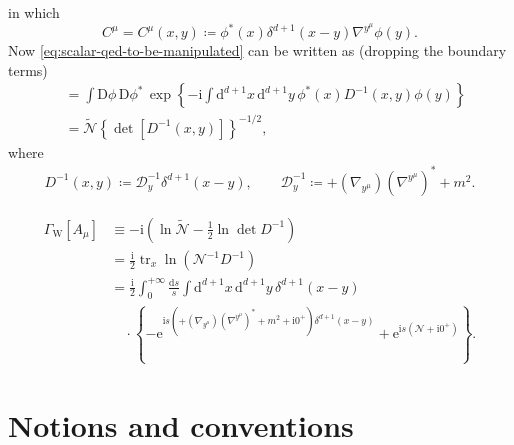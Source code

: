 \documentclass[12pt]{article}
\newcommand\mi{\mathrm{i}} %
\newcommand\me{\mathrm{e}} %
\newcommand\dif{\mathrm{d}}
\newcommand\Dif{\mathrm{D}}
\DeclareMathOperator{\tr}{tr}
\DeclareMathOperator{\Tr}{Tr}
\newcommand{\rbr}[1]{{\left(#1\right)}}
\newcommand{\cbr}[1]{{\left\{#1\right\}}}
\newcommand{\rfun}[2]{{#1}\mathopen{}\left(#2\right)\mathclose{}}
\newcommand{\sfun}[2]{{#1}\mathopen{}\left[#2\right]\mathclose{}}
\newcommand{\cfun}[2]{{#1}\mathopen{}\left\{#2\right\}\mathclose{}}
\begin{document}
in which
\begin{equation}
C^\mu = \rfun{C^\mu}{x,y} \coloneqq \rfun{\phi^*}{x} 
\rfun{\delta^{d+1}}{x-y} \nabla^{y^\mu}\rfun{\phi}{y}.
\end{equation}
Now \cref{eq:scalar-qed-to-be-manipulated} can be written as (dropping the 
boundary terms)
\begin{align}
&= \int\Dif\phi\,\Dif\phi^*\,
\cfun{\exp}{-\mi\int\dif^{d+1} x\,\dif^{d+1} y\,
\rfun{\phi^*}{x} \rfun{D^{-1}}{x, y} \rfun{\phi}{y}}
\nonumber \\
&= \tilde{\mathcal{N}}\cbr{\sfun{\det}{\rfun{D^{-1}}{x, y}}}^{-1/2},
\end{align}
where
\begin{align}
\rfun{D^{-1}}{x, y} \coloneqq \mathcal{D}^{-1}_y \rfun{\delta^{d+1}}{x-y},\qquad
\mathcal{D}^{-1}_y \coloneqq +\rbr{\nabla_{y^\mu}}\rbr{\nabla^{y^\mu}}^* + m^2.
\end{align}

\begin{align}
\sfun{\varGamma_\text{W}}{A_\mu} &\equiv
-\mi\rbr{\ln\tilde{\mathcal{N}} - \frac{1}{2} \ln \det D^{-1}} \nonumber \\
&= \frac{\mi}{2} \tr_x \rfun{\ln}{\mathcal{N}^{-1} D^{-1}} \nonumber \\
&= \frac{\mi}{2} \int_0^{+\infty}\frac{\dif s}{s}
\int\dif^{d+1}x\,\dif^{d+1}y\,\rfun{\delta^{d+1}}{x-y} \nonumber \\
&\quad\cdot\cbr{
-\me^{\mi s\rbr{+\rbr{\nabla_{y^\mu}}\rbr{\nabla^{y^\mu}}^* + m^2 + \mi 0^+}
\rfun{\delta^{d+1}}{x-y}}
+\me^{\mi s\rbr{\mathcal{N}+\mi 0^+}}}.
\end{align}




\cite{weisskopf1936}




\appendix

\section{Notions and conventions}
\end{document}
